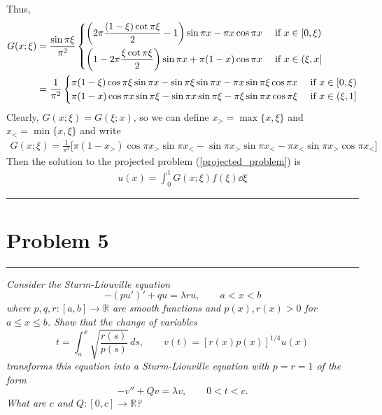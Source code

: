 \documentclass{article} %
\theoremstyle{plain}
\def\Rl{\mathbb{R}}
\newcommand{\problem}[1]{
\vspace{.375cm}
\begin{minipage}{\textwidth}
    \begin{center}
        \noindent\rule{5cm}{1pt}
    \end{center}
    \section{\bf #1}
    \begin{center}
        \noindent\rule{5cm}{1pt}
    \end{center}
    \vspace{0.25cm}
\end{minipage}
}
\begin{document}
Thus,
\begin{align*}
    G(x;\xi) &= \frac{\sin\pi\xi}{\pi^2}\begin{cases}
        \qty(2\pi \dfrac{(1-\xi)\cot\pi\xi}{2} - 1)\sin \pi x - \pi x\cos\pi x & \text{ if } x \in [0,\xi) \\[.3cm]
        \qty(1 - 2\pi \dfrac{\xi\cot\pi\xi}{2})\sin \pi x + \pi(1-x)\cos\pi x & \text{ if } x \in (\xi,x]
    \end{cases} \\
    &= \frac{1}{\pi^2}\begin{cases}
        \pi(1 - \xi)\cos\pi\xi \sin\pi x  - \sin\pi\xi\sin\pi x - \pi x\sin\pi\xi\cos\pi x & \text{ if } x \in [0,\xi)\\
        \pi(1 - x)\cos\pi x \sin\pi \xi  - \sin\pi x\sin\pi \xi - \pi \xi\sin\pi x\cos\pi \xi & \text{ if } x \in (\xi,1]
    \end{cases}
\end{align*}
Clearly, $G(x;\xi) = G(\xi;x)$, so we can define $x_> = \max\{x, \xi\}$ and $x_< = \min\{x,\xi\}$ and write
\begin{align*}
    G(x;\xi) = \frac{1}{\pi^2}\Big[\pi(1 - x_>)\cos\pi x_> \sin\pi x_<  - \sin\pi x_>\sin\pi x_< - \pi x_<\sin\pi x_>\cos\pi x_<\Big]
\end{align*}
Then the solution to the projected problem (\ref{projected_problem}) is
\begin{align*}
    u(x) = \int_0^1 G(x;\xi)f(\xi)\dd \xi
\end{align*}


\problem{Problem 5}
\emph{Consider the Sturm-Liouville equation
\[
-(pu')' + q u = \lambda r u,\qquad a<x<b
\]
where $p, q, r: [a,b] \to \Rl$ are smooth functions and $p(x), r(x) > 0$ for $a\le x\le b$.
Show that the change of variables
\[
t = \int_a^x \sqrt{\frac{r(s)}{p(s)}}\, ds,\qquad v(t) = \left[r(x) p(x)\right]^{1/4} u(x)
\]
transforms this equation into a  Sturm-Liouville equation with $p=r=1$ of the form
\[
-v'' + Q v = \lambda v,\qquad 0<t<c.
\]
What are $c$ and $Q:[0,c]\to \Rl$?
}
\end{document}
